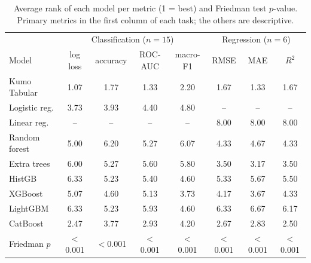 \begin{table}[t]
\centering
\small
\caption{Average rank of each model per metric (1 = best) and Friedman test $p$-value. Primary metrics in the first column of each task; the others are descriptive.}
\label{tab:ranks}
\begin{tabular}{lcccc|ccc}
\toprule
& \multicolumn{4}{c|}{Classification ($n=15$)} & \multicolumn{3}{c}{Regression ($n=6$)} \\
Model & log loss & accuracy & ROC-AUC & macro-F1 & RMSE & MAE & $R^2$ \\
\midrule
Kumo Tabular & 1.07 & 1.77 & 1.33 & 2.20 & 1.67 & 1.33 & 1.67 \\
Logistic reg. & 3.73 & 3.93 & 4.40 & 4.80 & -- & -- & -- \\
Linear reg. & -- & -- & -- & -- & 8.00 & 8.00 & 8.00 \\
Random forest & 5.00 & 6.20 & 5.27 & 6.07 & 4.33 & 4.67 & 4.33 \\
Extra trees & 6.00 & 5.27 & 5.60 & 5.80 & 3.50 & 3.17 & 3.50 \\
HistGB & 6.33 & 5.23 & 5.40 & 4.60 & 5.33 & 5.67 & 5.50 \\
XGBoost & 5.07 & 4.60 & 5.13 & 3.73 & 4.17 & 3.67 & 4.33 \\
LightGBM & 6.33 & 5.23 & 5.93 & 4.60 & 6.33 & 6.67 & 6.17 \\
CatBoost & 2.47 & 3.77 & 2.93 & 4.20 & 2.67 & 2.83 & 2.50 \\
\midrule
Friedman $p$ & $<$0.001 & $<$0.001 & $<$0.001 & $<$0.001 & $<$0.001 & $<$0.001 & $<$0.001 \\
\bottomrule
\end{tabular}
\end{table}
